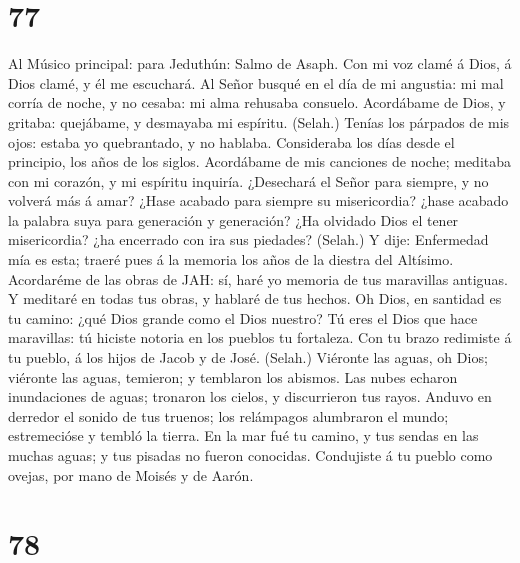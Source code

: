 \hypertarget{section-76}{%
\section{77}\label{section-76}}

 Al Músico principal: para Jeduthún: Salmo de Asaph. Con
mi voz clamé á Dios, á Dios clamé, y él me escuchará.  Al
Señor busqué en el día de mi angustia: mi mal corría de noche, y no
cesaba: mi alma rehusaba consuelo.  Acordábame de Dios, y
gritaba: quejábame, y desmayaba mi espíritu. (Selah.) 
Tenías los párpados de mis ojos: estaba yo quebrantado, y no hablaba.
 Consideraba los días desde el principio, los años de los
siglos.  Acordábame de mis canciones de noche; meditaba
con mi corazón, y mi espíritu inquiría.  ¿Desechará el
Señor para siempre, y no volverá más á amar?  ¿Hase
acabado para siempre su misericordia? ¿hase acabado la palabra suya para
generación y generación?  ¿Ha olvidado Dios el tener
misericordia? ¿ha encerrado con ira sus piedades? (Selah.)
 Y dije: Enfermedad mía es esta; traeré pues á la memoria
los años de la diestra del Altísimo.  Acordaréme de las
obras de JAH: sí, haré yo memoria de tus maravillas antiguas.
 Y meditaré en todas tus obras, y hablaré de tus hechos.
 Oh Dios, en santidad es tu camino: ¿qué Dios grande como
el Dios nuestro?  Tú eres el Dios que hace maravillas: tú
hiciste notoria en los pueblos tu fortaleza.  Con tu
brazo redimiste á tu pueblo, á los hijos de Jacob y de José. (Selah.)
 Viéronte las aguas, oh Dios; viéronte las aguas,
temieron; y temblaron los abismos.  Las nubes echaron
inundaciones de aguas; tronaron los cielos, y discurrieron tus rayos.
 Anduvo en derredor el sonido de tus truenos; los
relámpagos alumbraron el mundo; estremecióse y tembló la tierra.
 En la mar fué tu camino, y tus sendas en las muchas
aguas; y tus pisadas no fueron conocidas.  Condujiste á
tu pueblo como ovejas, por mano de Moisés y de Aarón.

\hypertarget{section-77}{%
\section{78}\label{section-77}}

